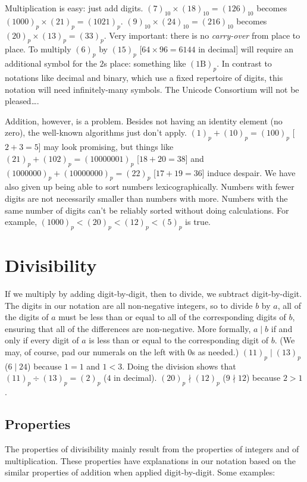 \documentclass[12pt]{article}
\newcommand{\ppn}[1]{(#1)_p}
\begin{document}
Multiplication is easy: just add digits. $(7)_{10} \times (18)_{10} = (126)_{10}$ becomes $\ppn{1000} \times \ppn{21} = \ppn{1021}$. $(9)_{10} \times (24)_{10} = (216)_{10}$ becomes $\ppn{20} \times \ppn{13} = \ppn{33}$. Very important: there is no \textit{carry-over} from place to place. To multiply $\ppn{6}$ by $\ppn{15}$ [$64 \times 96 = 6144$ in decimal] will require an additional symbol for the $2$s place: something like $(1\mathrm{B})_p$. In contrast to notations like decimal and binary, which use a fixed repertoire of digits, this notation will need infinitely-many symbols. The Unicode Consortium will not be pleased\ldots.

Addition, however, is a problem. Besides not having an identity element (no zero), the well-known algorithms just don't apply. $\ppn{1} + \ppn{10} = \ppn{100}$ [$2+3=5$] may look promising, but things like $\ppn{21} + \ppn{102} = \ppn{10000001}$ [$18+20=38$] and $\ppn{1000000} + \ppn{10000000} = \ppn{22}$ [$17+19=36$] induce despair. We have also given up being able to sort numbers lexicographically. Numbers with fewer digits are not necessarily smaller than numbers with more. Numbers with the same number of digits can't be reliably sorted without doing calculations. For example, $\ppn{1000} < \ppn{20} < \ppn{12} < \ppn{5}$ is true.

\section*{Divisibility}
If we multiply by adding digit-by-digit, then to divide, we subtract digit-by-digit. The digits in our notation are all non-negative integers, so to divide $b$ by $a$, all of the digits of $a$ must be less than or equal to all of the corresponding digits of $b$, ensuring that all of the differences are non-negative. More formally, $a \mid b$ if and only if every digit of $a$ is less than or equal to the corresponding digit of $b$. (We may, of course, pad our numerals on the left with $0$s as needed.) $\ppn{11} \mid \ppn{13}$ ($6 \mid 24$) because $1 = 1$ and $1 < 3$. Doing the division shows that $\ppn{11} \div \ppn{13} = \ppn{2}$ ($4$ in decimal). $\ppn{20} \nmid \ppn{12}$ ($9 \nmid 12$) because $2 > 1$.

\subsection*{Properties}
The properties of divisibility mainly result from the properties of integers and of multiplication. These properties have explanations in our notation based on the similar properties of addition when applied digit-by-digit. Some examples:
\end{document}
